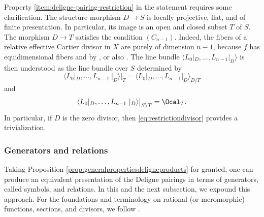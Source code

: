 \begin{remark}\label{rmk:clarification-restriction}
Property \eqref{item:deligne-pairing-restriction} in the statement requires some clarification. The structure morphism $D\to S$ is locally projective, flat, and of finite presentation. In particular, its image is an open and closed subset $T$ of $S$. The morphism $D\to T$ satisfies the condition $(C_{n-1})$. Indeed, the fibers of a relative effective Cartier divisor in $X$ are purely of dimension $n-1$, because $f$ has equidimensional fibers and by \cite[Prop.\,16.4.1]{EGAIV1}, or also \cite[Cor.\,5.2.4]{EGAIV2}. The line bundle $\langle L_{0}|_D,\ldots,L_{n-1}|_D\rangle$ is then understood as the line bundle over $S$ determined by
\begin{displaymath}
\langle L_{0}|_D,\ldots,L_{n-1}\ |_D\rangle\big|_{T}=\langle L_{0}|_D,\ldots,L_{n-1}|_D\rangle_{D/T}
\end{displaymath}
and
\begin{displaymath}
\langle L_{0}|_D,\ldots,L_{n-1}\ |_D\rangle\big|_{S\setminus T}=\Ocal_{T}.
\end{displaymath}
In particular, if $D$ is the zero divisor, then \eqref{eq:restrictiondivisor} provides a trivialization.
\end{remark}

\subsubsection{Generators and relations}\label{subsubsec:generators-relations}
Taking Proposition \ref{prop:generalpropertiesdeligneproducts} for granted, one can produce an equivalent presentation of the Deligne pairings in terms of generators, called symbols, and relations. In this and the next subsection, we expound this approach. For the foundations and terminology on rational (or meromorphic) functions, sections, and divisors, we follow \cite[ \& ]{EGAIV4}.

